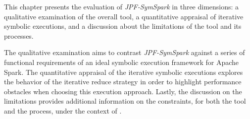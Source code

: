 
This chapter presents the evaluation of \textit{JPF-SymSpark} in three dimensions: a qualitative examination of the overall tool, a quantitative appraisal of iterative symbolic executions, and a discussion about the limitations of the tool and its processes. 

The qualitative examination aims to contrast \textit{JPF-SymSpark} against a series of functional requirements of an ideal symbolic execution framework for Apache Spark. The quantitative appraisal of the iterative symbolic executions explores the behavior of the iterative reduce strategy in order to highlight performance obstacles when choosing this execution approach. Lastly, the discussion on the limitations provides additional information on the constraints, for both the tool and the process, under the context of \jpf{}.




